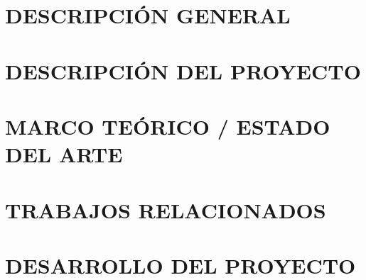 \documentclass{report}
\begin{document}
	\chapter{DESCRIPCIÓN GENERAL}
	
	\chapter{DESCRIPCIÓN DEL PROYECTO}
	
	\chapter{MARCO TEÓRICO / ESTADO DEL ARTE}
	
	\chapter{TRABAJOS RELACIONADOS}
	
	\chapter{DESARROLLO DEL PROYECTO}
	
	\clearpage
	\renewcommand{\bibname}{REFERENCIAS}
	
	\setlength{\bibsep}{2em plus 0.5ex}
	\clearpage
	\appendix
	\renewcommand{\appendixname}{ANEXOS}
	\renewcommand{\appendixpagename}{ANEXOS}
	\renewcommand{\appendixtocname}{ANEXOS}
	\addappheadtotoc	
	
\end{document}
